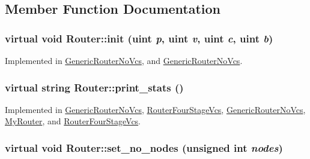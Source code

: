 \subsection{Member Function Documentation}
\hypertarget{classRouter_7c551f11fcda9accb02da87c671c4065}{
\subsubsection[{init}]{\setlength{\rightskip}{0pt plus 5cm}virtual void Router::init ({\bf uint} {\em p}, \/  {\bf uint} {\em v}, \/  {\bf uint} {\em c}, \/  {\bf uint} {\em b})}}
\label{classRouter_7c551f11fcda9accb02da87c671c4065}




Implemented in \hyperlink{classGenericRouterNoVcs_d0abf72a39438d7b23b9b03029d75da2}{GenericRouterNoVcs}, and \hyperlink{classGenericRouterNoVcs_d0abf72a39438d7b23b9b03029d75da2}{GenericRouterNoVcs}.\hypertarget{classRouter_75995624d8bd533a9d3eb8c06a62ce07}{
\subsubsection[{print\_\-stats}]{\setlength{\rightskip}{0pt plus 5cm}virtual string Router::print\_\-stats ()}}
\label{classRouter_75995624d8bd533a9d3eb8c06a62ce07}




Implemented in \hyperlink{classGenericRouterNoVcs_897a642767b5ecf17ec45220d201b7e6}{GenericRouterNoVcs}, \hyperlink{classRouterFourStageVcs_22248991584f945954ef5f520b786c15}{RouterFourStageVcs}, \hyperlink{classGenericRouterNoVcs_897a642767b5ecf17ec45220d201b7e6}{GenericRouterNoVcs}, \hyperlink{classMyRouter_ce28b171a1f2f93fa96f9d6a65fadbbe}{MyRouter}, and \hyperlink{classRouterFourStageVcs_22248991584f945954ef5f520b786c15}{RouterFourStageVcs}.\hypertarget{classRouter_33073537e883e8bea1a25690bcb70049}{
\subsubsection[{set\_\-no\_\-nodes}]{\setlength{\rightskip}{0pt plus 5cm}virtual void Router::set\_\-no\_\-nodes (unsigned int {\em nodes})}}
\label{classRouter_33073537e883e8bea1a25690bcb70049}




